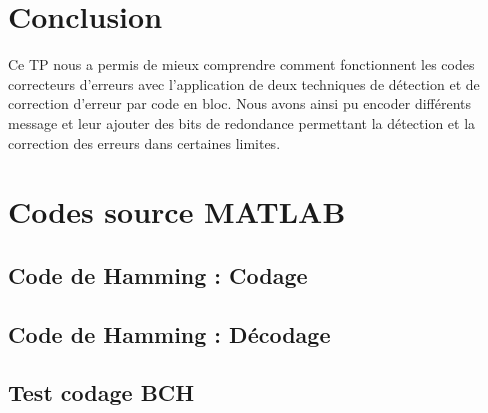 \documentclass[a4paper, 12pt]{article}
\newcommand{\FSource}[1]{%

}
\begin{document}
\newpage

\section{Conclusion}
Ce TP nous a permis de mieux comprendre comment fonctionnent les codes correcteurs d'erreurs avec l'application de deux techniques de détection et de correction d'erreur par code en bloc. Nous avons ainsi pu encoder différents message et leur ajouter des bits de redondance permettant la détection et la correction des erreurs dans certaines limites.
\clearpage

%
%
\appendix

\section{Codes source MATLAB}

\subsection{Code de Hamming : Codage}\label{hamcode}

\FSource{../hamcode.m}

\newpage

\subsection{Code de Hamming : Décodage}\label{hamdecode}

\FSource{../hamdecode.m}

\newpage

\subsection{Test codage BCH}\label{bchtest}

\FSource{../bchtest.m}
\end{document}
